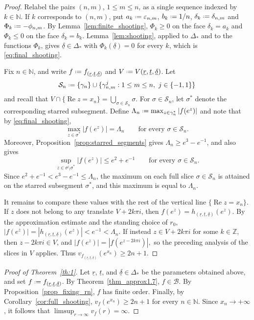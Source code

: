 \documentclass[a4paper, 11pt, reqno]{amsart}
\numberwithin{equation}{section}
\theoremstyle{plain}
\newcommand*{\defeq}{\mathrel{\vcenter{\baselineskip0.5ex \lineskiplimit0pt
 \hbox{\scriptsize.}\hbox{\scriptsize.}}}=}
\theoremstyle{remark}
\newcommand{\Z}{{\mathbb{Z}}}
\newcommand{\N}{{\mathbb{N}}}
\newcommand{\uldelta}{\underline{\delta}}
\newcommand{\ulr}{\underline{r}}
\newcommand{\ult}{\underline{t}}
\newcommand{\Rea}{\operatorname{Re }}
\begin{document}
\begin{proof}
	Relabel the pairs \((n,m)\), \(1\le m\le n\), as a single sequence indexed by \(k\in\N\).  If \(k\) corresponds to \((n,m)\), put \(a_k\defeq\varepsilon_{n,m}\), \(b_k\defeq1/n\), \(\delta_k\defeq\delta_{n,m}\) and \(\Phi_k\defeq-\phi_{n,m}\).  By Lemma~\ref{lem:finite_shooting}, \(\Phi_k\ge0\) on the face \(\delta_k=a_k\) and \(\Phi_k\le0\) on the face \(\delta_k=b_k\).  Lemma~\ref{lem:shooting}, applied to \(\Delta_*\) and to the functions \(\Phi_k\), gives \(\uldelta\in\Delta_*\) with \(\Phi_k(\uldelta)=0\) for every \(k\), which is \eqref{eq:final_shooting}.
	
	Fix \(n\in\N\), and write \(f\defeq f_{(\ulr,\ult,\uldelta)}\) and
	\(V\defeq V(\ulr,\ult,\uldelta)\). Let
	\[
	\mathcal S_n\defeq
	\{\gamma_n\}\cup
	\{\gamma^j_{n,m}:1\le m\le n,\ j\in\{-1,1\}\}
	\]
	and recall that 
	$
	V\cap\{\Rea z=x_n\}
	=\bigcup_{\sigma\in\mathcal S_n}\sigma.$
	For
	\(\sigma\in\mathcal S_n\), let \(\sigma^*\) denote the corresponding starred
	subsegment. Define
	$
	\Lambda_n\defeq
	\max_{z\in\gamma_n^*}|f(e^z)|
	$ and note that 
	by \eqref{eq:final_shooting},
	\[
	\max_{z\in\sigma^*}|f(e^z)|=\Lambda_n
	\qquad\text{for every }\sigma\in\mathcal S_n.
	\]
	Moreover, Proposition~\ref{prop:starred_segments} gives
	\(\Lambda_n\ge e^3-e^{-1}\), and also gives
	\[
	\sup_{z\in\sigma\setminus\sigma^*}|f(e^z)|
	\le e^2+e^{-1}
	\qquad\text{for every }\sigma\in\mathcal S_n.
	\]
	Since \(e^2+e^{-1}<e^3-e^{-1}\le\Lambda_n\), the maximum on each full slice
	\(\sigma\in\mathcal S_n\) is attained on the starred subsegment \(\sigma^*\),
	and this maximum is equal to \(\Lambda_n\).
	
	It remains to compare these values with the rest of the vertical line
	\(\{\Rea z=x_n\}\). If \(z\) does not belong to any translate
	\(V+2k\pi i\), then \(f(e^z)=h_{(\ulr,\ult,\uldelta)}(e^z)\). By the
	approximation estimate and the standing choice of \(r_0\),
	$
	|f(e^z)|=|h_{(\ulr,\ult,\uldelta)}(e^z)|<e^{-1}<\Lambda_n.
	$
	If instead \(z\in V+2k\pi i\) for some \(k\in\Z\), then \(z-2k\pi i\in V\), and
	$
	|f(e^z)|=|f(e^{z-2k\pi i})|,
	$
	so the preceding analysis of the slices in \(V\) applies. Thus
	$
	v_{f_{(\ulr,\ult,\uldelta)}}(e^{x_n})\ge 2n+1.
	$
\end{proof}

\begin{proof}[Proof of Theorem~\ref{th:1}]
	Let \(\ulr\), \(\ult\), and \(\uldelta\in\Delta_*\) be the parameters obtained above, and set \(f\defeq f_{(\ulr,\ult,\uldelta)}\). By Theorem~\ref{thm_approx1.7}, \(f\in\mathcal B\). By Proposition~\ref{prop_fixing_rn}, \(f\) has finite order. Finally, by Corollary~\ref{cor:full_shooting}, \(v_f(e^{x_n})\ge 2n+1\) for every \(n\in\N\). Since \(x_n\to+\infty\), it follows that \(\limsup_{r\to\infty}v_f(r)=\infty\).
\end{proof}




\end{document}
